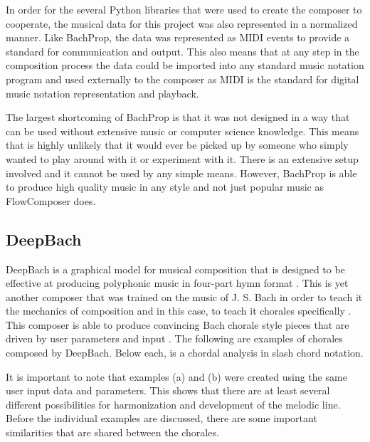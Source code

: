 \vspace{\baselineskip}

In order for the several Python libraries that were used to create the composer to cooperate, the musical data for this project was also represented in a normalized manner.  Like BachProp, the data was represented as MIDI events to provide a standard for communication and output.  This also means that at any step in the composition process the data could be imported into any standard music notation program and used externally to the composer as MIDI is the standard for digital music notation representation and playback.

\vspace{\baselineskip}

The largest shortcoming of BachProp is that it was not designed in a way that can be used without extensive music or computer science knowledge.  This means that is highly unlikely that it would ever be picked up by someone who simply wanted to play around with it or experiment with it.  There is an extensive setup involved and it cannot be used by any simple means.  However, BachProp is able to produce high quality music in any style and not just popular music as FlowComposer does.

\subsection{DeepBach}
\label{subsec:deepbach}

DeepBach is a graphical model for musical composition that is designed to be effective at producing polyphonic music in four-part hymn format \cite{Hadjeres_2016}.  This is yet another composer that was trained on the music of J. S. Bach in order to teach it the mechanics of composition and in this case, to teach it chorales specifically \cite{Hadjeres_2016}.  This composer is able to produce convincing Bach chorale style pieces that are driven by user parameters and input \cite{Hadjeres_2016}.  The following are examples of chorales composed by DeepBach.  Below each, is a chordal analysis in slash chord notation.

\pagebreak

It is important to note that examples (a) and (b) were created using the same user input data and parameters.  This shows that there are at least several different possibilities for harmonization and development of the melodic line.  Before the individual examples are discussed, there are some important similarities that are shared between the chorales.

